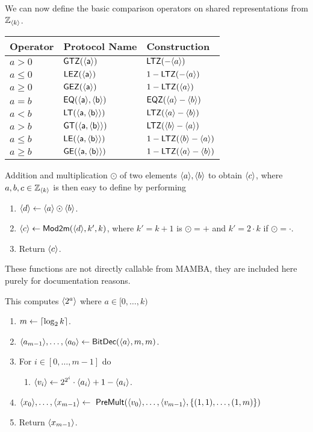 We can now define the basic comparison operators on shared
representations from ${\mathbb{Z}}_{\langle k \rangle}$.
\begin{center}
\begin{tabular}{|lll|}
\hline
Operator & Protocol Name & Construction \\
\hline
$a>0$    & $\mathsf{GTZ(\langle a \rangle)}$           & $\mathsf{LTZ}(-\langle a \rangle)$ \\
$a\le0$  & $\mathsf{LEZ(\langle a \rangle)}$           & $1-\mathsf{LTZ}(-\langle a \rangle)$ \\
$a\ge0$  & $\mathsf{GEZ(\langle a \rangle)}$           & $1-\mathsf{LTZ}(\langle a \rangle)$ \\
$a=b$    & $\mathsf{EQ(\langle a \rangle,\langle b \rangle)}$ & $\mathsf{EQZ}(\langle a \rangle-\langle b \rangle)$ \\
$a<b$    & $\mathsf{LT(\langle a,\langle b \rangle \rangle)}$ & $\mathsf{LTZ}(\langle a \rangle-\langle b \rangle)$ \\
$a>b$    & $\mathsf{GT(\langle a,\langle b \rangle \rangle)}$ & $\mathsf{LTZ}(\langle b \rangle-\langle a \rangle)$ \\
$a\le b$ & $\mathsf{LE(\langle a,\langle b \rangle \rangle)}$ & $1-\mathsf{LTZ}(\langle b \rangle-\langle a \rangle)$ \\
$a\ge b$ & $\mathsf{GE(\langle a,\langle b \rangle \rangle)}$ & $1-\mathsf{LTZ}(\langle a \rangle-\langle b \rangle)$ \\
\hline
\end{tabular}
\end{center}

Addition and multiplication $\odot$ of two elements $\langle a \rangle, \langle b \rangle$
to obtain $\langle c \rangle$, where $a,b,c \in {\mathbb{Z}}_{\langle k \rangle}$ is then easy to define 
by performing 
\begin{enumerate}
\item $\langle d \rangle \leftarrow \langle a \rangle \odot \langle b \rangle$.
\item $\langle c \rangle \leftarrow \mathsf{Mod2m}(\langle d \rangle,k',k)$,
	where $k'=k+1$ is $\odot=+$ and $k'=2\cdot k$ if $\odot=\cdot$.
\item Return $\langle c \rangle$.
\end{enumerate}
These functions are not directly callable from MAMBA, they are
included here purely for documentation reasons.

This computes $\langle 2^a \rangle$ where $a \in [0,\ldots,k)$
\begin{enumerate}
\item $m \leftarrow {\lceil \log_2 k \rceil}$.
\item $\langle a_{m-1} \rangle,\ldots,\langle a_0 \rangle \leftarrow \mathsf{BitDec}(\langle a \rangle,m,m)$.
\item For $i\in [0,\ldots,m-1]$ do 
\begin{enumerate}
  \item $\langle v_i \rangle \leftarrow 2^{2^i} \cdot \langle a_i \rangle+1-\langle a_i \rangle$.
\end{enumerate}
\item $\langle x_0 \rangle,\ldots,\langle x_{m-1} \rangle
	\leftarrow \ \mathsf{PreMult}(\langle v_0 \rangle,\ldots,\langle v_{m-1} \rangle, \{(1,1),\ldots,(1,m)\})$
\item Return $\langle x_{m-1} \rangle$.
\end{enumerate}
